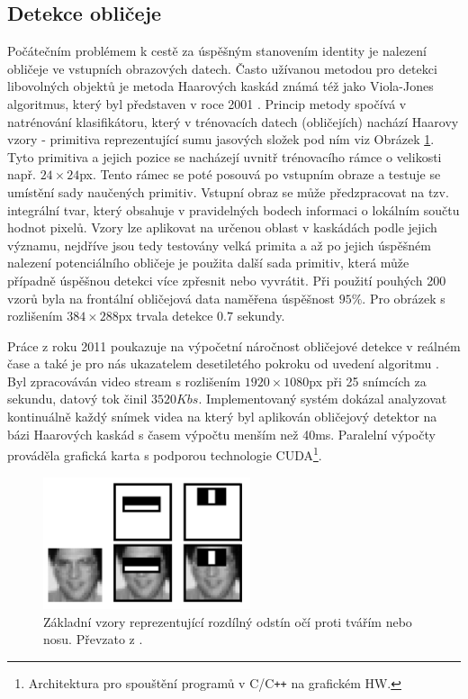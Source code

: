 \documentclass[czech,BP]{thesiskiv}
\begin{document}
\subsection{Detekce obličeje}
Počátečním problémem k cestě za úspěšným stanovením identity je nalezení obličeje ve vstupních obrazových datech. Často užívanou metodou pro detekci libovolných objektů je metoda Haarových kaskád známá též jako Viola-Jones algoritmus, který byl představen v roce 2001 \citet{ViolaJones2001}. Princip metody spočívá v natrénování klasifikátoru, který v trénovacích datech (obličejích) nachází Haarovy vzory - primitiva reprezentující sumu jasových složek pod ním viz Obrázek \ref{fig:haar}. Tyto primitiva a jejich pozice se nacházejí uvnitř trénovacího rámce o velikosti např. $24\times24$px. Tento rámec se poté posouvá po vstupním obraze a testuje se umístění sady naučených primitiv. Vstupní obraz se může předzpracovat na tzv. integrální tvar, který obsahuje v pravidelných bodech informaci o lokálním součtu hodnot pixelů. Vzory lze aplikovat na určenou oblast v kaskádách podle jejich významu, nejdříve jsou tedy testovány velká primita a až po jejich úspěšném nalezení potenciálního obličeje je použita další sada primitiv, která může případně úspěšnou detekci více zpřesnit nebo vyvrátit. Při použití pouhých 200 vzorů byla na frontální obličejová data naměřena úspěšnost $95\%$. Pro obrázek s rozlišením $384\times 288$px trvala detekce $0.7$ sekundy. 

Práce z roku 2011 \citet{Herta2011} poukazuje na výpočetní náročnost obličejové detekce v reálném čase a také je pro nás ukazatelem desetiletého pokroku od uvedení algoritmu \cite{ViolaJones2001}. Byl zpracováván video stream s rozlišením $1920\times1080$px při 25 snímcích za sekundu, datový tok činil $3520Kbs$. Implementovaný systém dokázal analyzovat kontinuálně každý snímek videa na který byl aplikován obličejový detektor na bázi Haarových kaskád s časem výpočtu menším než 40ms. Paralelní výpočty prováděla grafická karta s podporou technologie CUDA\footnote{Architektura pro spouštění programů v C/C\texttt{++} na grafickém HW.}.

\begin{figure}[h!]
\begin{center}
\includegraphics[width=230px]{img/haar_face.png}
\caption{Základní vzory reprezentující rozdílný odstín očí proti tvářím nebo nosu. Převzato z \cite{ViolaJones2001}.}
\label{fig:haar}
\end{center}
\end{figure}
\end{document}
